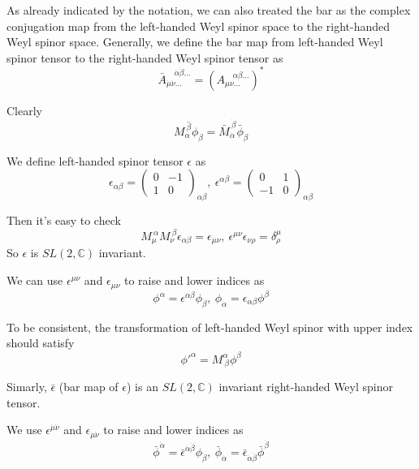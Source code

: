 \documentclass[12pt]{book}
\begin{document}
	As already indicated by the notation, we can also treated the bar as the complex conjugation map from the left-handed Weyl spinor space to the right-handed Weyl spinor space. Generally, we define the bar map from left-handed Weyl spinor tensor to the right-handed Weyl spinor tensor as
	\begin{equation}
		\bar A ^{\quad \dot\alpha\dot\beta\dots}_{\dot\mu\dot\nu\dots}=(A ^{\quad \alpha\beta\dots}_{\mu\nu\dots})^*
	\end{equation}
	
	Clearly 
	\begin{equation}
		\overline{M_\alpha^{\ \beta}\phi_\beta}=\bar M_{\dot\alpha}^{\ \dot\beta}\bar\phi_{\dot\beta}
	\end{equation}
	
	We define left-handed spinor tensor $\epsilon$ as
	\begin{equation}
		\epsilon_{\alpha\beta}=\begin{pmatrix}
			0&-1\\
			1&0
		\end{pmatrix}_{\alpha\beta},\ 
		\epsilon^{\alpha\beta}=\begin{pmatrix}
			0&1\\
			-1&0
		\end{pmatrix}_{\alpha\beta}
	\end{equation}
	
	Then it's easy to check
	\begin{equation}
		M_\mu^{\ \alpha}M_\nu^{\ \beta}\epsilon_{\alpha\beta}=\epsilon_{\mu\nu},\ \epsilon^{\mu\nu}\epsilon_{\nu\rho}=\delta^\mu_\rho
	\end{equation}
	So $\epsilon$ is $SL(2,\mathbb C)$ invariant.
	
	We can use $\epsilon^{\mu\nu}$ and $\epsilon_{\mu\nu}$ to raise and lower indices as
	\begin{equation}
		\phi^\alpha=\epsilon^{\alpha\beta}\phi_\beta,\ \phi_\alpha=\epsilon_{\alpha\beta}\phi^\beta
	\end{equation}
	
	To be consistent, the transformation of left-handed Weyl spinor with upper index should satisfy
	\begin{equation}
		\phi'^\alpha=M^\alpha_{\ \beta}\phi^\beta
	\end{equation}
		
	Simarly, $\bar\epsilon$ (bar map of $\epsilon$) is an $SL(2,\mathbb C)$ invariant right-handed Weyl spinor tensor.
	
	We use $\epsilon^{\dot\mu\dot\nu}$ and $\epsilon_{\dot\mu\dot\nu}$ to raise and lower indices as
	\begin{equation}
		\bar\phi^{\dot\alpha}=\bar\epsilon^{\dot\alpha\dot\beta}\phi_{\dot\beta},\ \bar\phi_{\dot\alpha}=\bar\epsilon_{\dot\alpha\dot\beta}\bar\phi^{\dot\beta}
	\end{equation}
	
\end{document}
